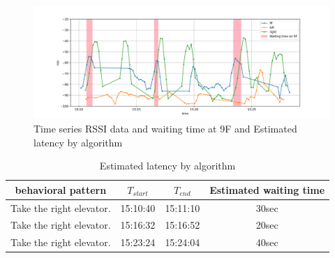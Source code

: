 \begin{figure}[t]
\centering
\includegraphics[width=1.0\hsize]{img/ble_rssi_9f_wait_guess.png}
\caption{Time series RSSI data and waiting time at 9F and Estimated latency by algorithm}
\label{fig:ble_rssi_9f_wait_quess}
\end{figure}

\begin{table}[ht]
\caption{Estimated latency by algorithm}
\label{table:record_table_guess}
\centering
\begin{tabular}{c|cc|c}
\hline
\textbf{behavioral pattern} & \textbf{$T_{start}$}  & \textbf{$T_{end}$} & \textbf{Estimated waiting time} \\ \hline\hline
Take the right elevator. & 15:10:40 & 15:11:10 & 30sec \\
Take the right elevator. & 15:16:32 & 15:16:52 & 20sec \\
Take the right elevator. & 15:23:24 & 15:24:04 & 40sec \\
\hline
\end{tabular}
\end{table}
